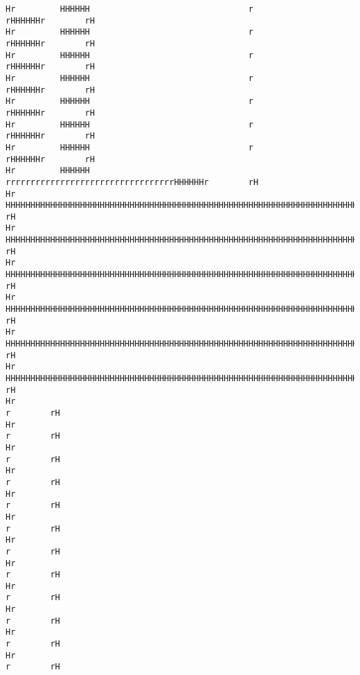 \documentclass[10pt,a4paper]{article}
\begin{document}
{\begin{verbatim}
Hr         HHHHHH                                r                                rHHHHHHr        rH
Hr         HHHHHH                                r                                rHHHHHHr        rH
Hr         HHHHHH                                r                                rHHHHHHr        rH
Hr         HHHHHH                                r                                rHHHHHHr        rH
Hr         HHHHHH                                r                                rHHHHHHr        rH
Hr         HHHHHH                                r                                rHHHHHHr        rH
Hr         HHHHHH                                r                                rHHHHHHr        rH
Hr         HHHHHH                                rrrrrrrrrrrrrrrrrrrrrrrrrrrrrrrrrrHHHHHHr        rH
Hr         HHHHHHHHHHHHHHHHHHHHHHHHHHHHHHHHHHHHHHHHHHHHHHHHHHHHHHHHHHHHHHHHHHHHHHHHHHHHHHr        rH
Hr         HHHHHHHHHHHHHHHHHHHHHHHHHHHHHHHHHHHHHHHHHHHHHHHHHHHHHHHHHHHHHHHHHHHHHHHHHHHHHHr        rH
Hr         HHHHHHHHHHHHHHHHHHHHHHHHHHHHHHHHHHHHHHHHHHHHHHHHHHHHHHHHHHHHHHHHHHHHHHHHHHHHHHr        rH
Hr         HHHHHHHHHHHHHHHHHHHHHHHHHHHHHHHHHHHHHHHHHHHHHHHHHHHHHHHHHHHHHHHHHHHHHHHHHHHHHHr        rH
Hr         HHHHHHHHHHHHHHHHHHHHHHHHHHHHHHHHHHHHHHHHHHHHHHHHHHHHHHHHHHHHHHHHHHHHHHHHHHHHHHr        rH
Hr         HHHHHHHHHHHHHHHHHHHHHHHHHHHHHHHHHHHHHHHHHHHHHHHHHHHHHHHHHHHHHHHHHHHHHHHHHHHHHHr        rH
Hr                                                                                       r        rH
Hr                                                                                       r        rH
Hr                                                                                       r        rH
Hr                                                                                       r        rH
Hr                                                                                       r        rH
Hr                                                                                       r        rH
Hr                                                                                       r        rH
Hr                                                                                       r        rH
Hr                                                                                       r        rH
Hr                                                                                       r        rH
Hr                                                                                       r        rH
Hr                                                                                       r        rH

\end{verbatim}}
\end{document}
